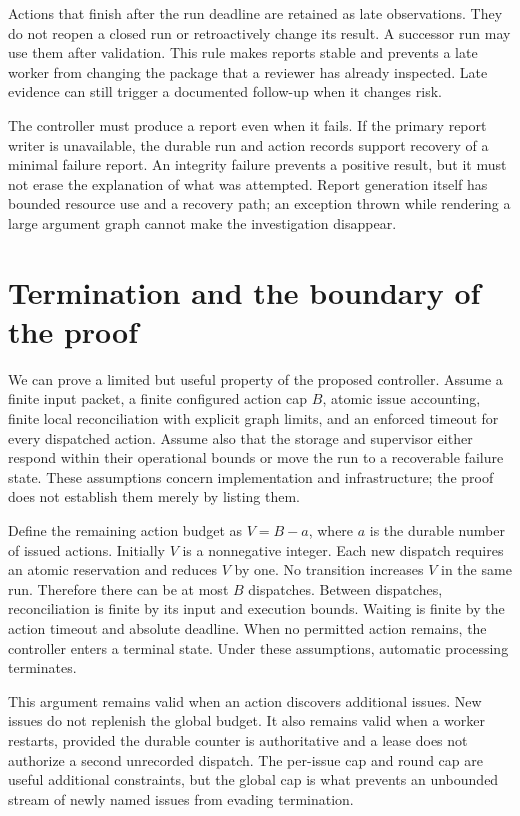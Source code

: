 Actions that finish after the run deadline are retained as late observations.
They do not reopen a closed run or retroactively change its result. A successor
run may use them after validation. This rule makes reports stable and prevents a
late worker from changing the package that a reviewer has already inspected.
Late evidence can still trigger a documented follow-up when it changes risk.

The controller must produce a report even when it fails. If the primary report
writer is unavailable, the durable run and action records support recovery of a
minimal failure report. An integrity failure prevents a positive result, but it
must not erase the explanation of what was attempted. Report generation itself
has bounded resource use and a recovery path; an exception thrown while rendering
a large argument graph cannot make the investigation disappear.

\section{Termination and the boundary of the proof}
\label{merge:M06:16}


We can prove a limited but useful property of the proposed controller. Assume a
finite input packet, a finite configured action cap $B$, atomic issue accounting,
finite local reconciliation with explicit graph limits, and an enforced timeout
for every dispatched action. Assume also that the storage and supervisor either
respond within their operational bounds or move the run to a recoverable failure
state. These assumptions concern implementation and infrastructure; the proof
does not establish them merely by listing them.

Define the remaining action budget as $V=B-a$, where $a$ is the durable number of
issued actions. Initially $V$ is a nonnegative integer. Each new dispatch requires
an atomic reservation and reduces $V$ by one. No transition increases $V$ in the
same run. Therefore there can be at most $B$ dispatches. Between dispatches,
reconciliation is finite by its input and execution bounds. Waiting is finite by
the action timeout and absolute deadline. When no permitted action remains, the
controller enters a terminal state. Under these assumptions, automatic processing
terminates.

This argument remains valid when an action discovers additional issues. New
issues do not replenish the global budget. It also remains valid when a worker
restarts, provided the durable counter is authoritative and a lease does not
authorize a second unrecorded dispatch. The per-issue cap and round cap are useful
additional constraints, but the global cap is what prevents an unbounded stream
of newly named issues from evading termination.

